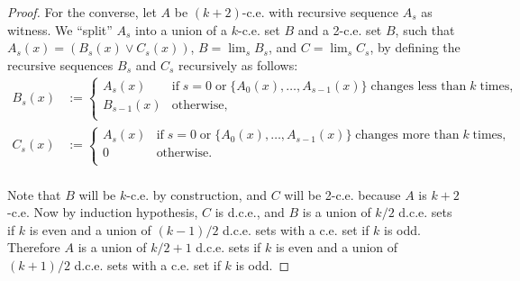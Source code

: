 \documentclass{article}
\begin{document}
\begin{enumerate}[label={\bf Q\arabic*:}]
\begin{proof}
      For the converse, let $A$ be $(k+2)$-c.e. with recursive sequence
      $A_s$ as witness. We ``split'' $A_s$ into a union of a $k$-c.e.
      set $B$ and a 2-c.e. set $B$, such that $A_s(x)=(B_s(x)\vee C_s(x))$,
      $B=\lim_sB_s$, and $C=\lim_sC_s$, by defining the recursive sequences
      $B_s$ and $C_s$ recursively as follows:
      \begin{align*}
        B_s(x) &:=
        \begin{cases}
          A_s(x) &\text{if}\; s=0\; \text{or}\;
            \{A_0(x),\ldots,A_{s-1}(x)\}\; \text{changes less than}\; k\;
            \text{times},\\
          B_{s-1}(x) &\text{otherwise},\\
        \end{cases}\\
        C_s(x) &:=
        \begin{cases}
          A_s(x) &\text{if}\; s=0\; \text{or}\;
            \{A_0(x),\ldots,A_{s-1}(x)\}\; \text{changes more than}\; k\;
            \text{times},\\
          0 &\text{otherwise}.\\
        \end{cases}\\
      \end{align*}

      Note that $B$ will be $k$-c.e. by construction, and $C$ will be
      2-c.e. because $A$ is $k+2$-c.e. Now by induction hypothesis, $C$
      is d.c.e., and $B$ is a union of $k/2$ d.c.e. sets if $k$ is even and
      a union of $(k-1)/2$ d.c.e. sets with a c.e. set if $k$ is odd.
      Therefore $A$ is a union of $k/2+1$ d.c.e. sets if $k$ is even and
      a union of $(k+1)/2$ d.c.e. sets with a c.e. set if $k$ is odd.
    \end{proof}
\end{enumerate}
\end{document}
